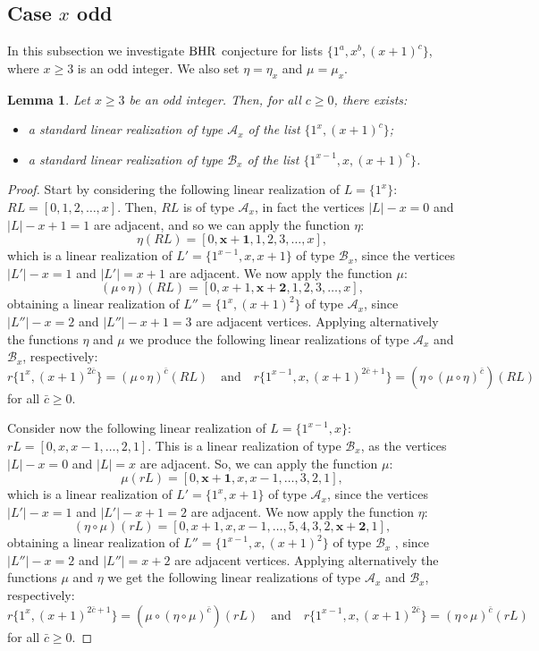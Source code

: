 \documentclass{amsart}
\newtheorem{lem}[prop]{Lemma}
\theoremstyle{definition}
\numberwithin{equation}{section}
\def\A{\mathcal{A}}
\def\B{\mathcal{B}}
\def\BHR{\mathop{\rm BHR}}
\def\equad{\quad \textrm{and} \quad}
\begin{document}
\subsection{Case $x$ odd}

In this subsection we investigate $\BHR$ conjecture for lists $\{1^a,x^b,(x+1)^c\}$, where $x\geq 3$ is an odd integer.
We also set $\eta=\eta_x$ and  $\mu=\mu_x$.

\begin{lem}\label{odd0}
Let $x\geq 3$ be an odd integer. Then, for all $c\geq 0$, there exists:
\begin{itemize}
\item[(1)] a standard linear realization of type $\A_x$ of the list $\{1^x, (x+1)^c\}$;
\item[(2)] a standard linear realization of type $\B_x$ of the list $\{1^{x-1},x, (x+1)^c\}$.
\end{itemize}
\end{lem}
\begin{proof}
Start by considering the following linear realization of $L=\{1^x\}$:
$R L=[0,1,2,\ldots,x]$.
Then, $RL $ is of type $\A_x$, in fact the vertices $|L|-x=0$ and $|L|-x+1=1$ are adjacent, and so we can apply the
function $\eta$:
$$\eta(RL)=[0, \bm{x+1}, 1, 2, 3,\ldots,x],$$
which is a linear realization  of $L'=\{1^{x-1},x, x+1\}$ of type $\B_x$, since the vertices $|L'|-x=1$ and
$|L'|=x+1$ are adjacent.
We now apply the function $\mu$:
$$(\mu\circ\eta)(RL )=[0, x+1, \bm{x+2},1, 2, 3,\ldots,x],$$
obtaining a linear realization  of $L''=\{1^x, (x+1)^2\}$ of type $\A_x$, since $|L''|-x=2$ and $|L''|-x+1=3$ are
adjacent vertices.
Applying alternatively the functions $\eta$ and $\mu$ we produce the following linear realizations of type $\A_x$ and $\B_x$, respectively:
$$r\{1^x, (x+1)^{2\bar c} \}=(\mu \circ \eta)^{\bar c} (RL)\equad r\{1^{x-1}, x, (x+1)^{2\bar
c+1}\}=(\eta\circ(\mu\circ\eta)^{\bar c} )(RL )$$
for all $\bar c\geq 0$.

Consider now the following linear realization of $L=\{1^{x-1},x\}$:
$r L=[0,x,x-1,\ldots,2,1]$.
This is a linear realization of type $\B_x$, as the vertices $|L|-x=0$ and $|L|=x$ are adjacent. So, we can apply the
function $\mu$:
$$\mu(r L)=[0, \bm{x+1}, x, x-1,\ldots,3,2,1],$$
which is a linear realization  of $L'=\{1^{x},x+1 \}$ of type $\A_x$, since the vertices $|L'|-x=1$ and
$|L'|-x+1=2$ are adjacent. We now apply the function $\eta$:
$$(\eta\circ\mu)(r L )=[0, x+1,x,x-1,\ldots,5,4,3,2,\bm{x+2},1],$$
obtaining a linear realization of $L''=\{1^{x-1},x, (x+1)^2\}$ of type $\B_x$ , since $|L''|-x=2$ and $|L''|=x+2$ are
adjacent vertices.
Applying alternatively the functions $\mu$ and $\eta$ we get the following linear realizations of type
$\A_x$ and $\B_x$, respectively:
$$r\{1^x, (x+1)^{2\bar c+1} \}=(\mu\circ(\eta\circ\mu)^{\bar c}) (rL)\equad r\{1^{x-1}, x, (x+1)^{2\bar
c}\}=(\eta\circ\mu)^{\bar c} (rL )$$
for all $\bar c\geq 0$.
\end{proof}
\end{document}
